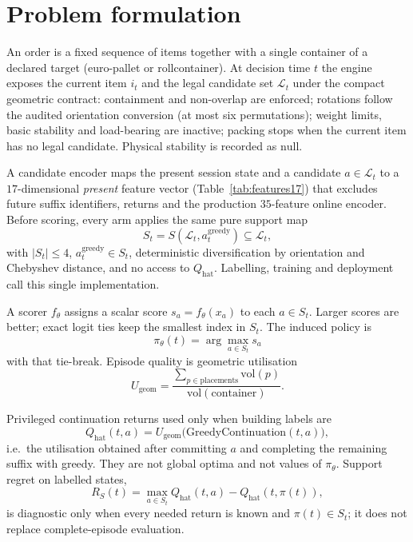 \section{Problem formulation}

An order is a fixed sequence of items together with a single container of a
declared target (euro-pallet or rollcontainer). At decision time $t$ the engine
exposes the current item $i_t$ and the legal candidate set $\mathcal{L}_t$ under
the compact geometric contract: containment and non-overlap are enforced;
rotations follow the audited orientation conversion (at most six permutations);
weight limits, basic stability and load-bearing are inactive; packing stops when
the current item has no legal candidate. Physical stability is recorded as
$\mathrm{null}$.

A candidate encoder maps the present session state and a candidate $a\in\mathcal{L}_t$
to a $17$-dimensional \emph{present} feature vector (Table~\ref{tab:features17}) that
excludes future suffix identifiers, returns and the production $35$-feature online
encoder. Before scoring, every arm applies the same pure support map
\begin{equation}
  S_t = S(\mathcal{L}_t,a^{\mathrm{greedy}}_t)\subseteq\mathcal{L}_t,
\end{equation}
with $|S_t|\le 4$, $a^{\mathrm{greedy}}_t\in S_t$, deterministic diversification
by orientation and Chebyshev distance, and no access to $Q_{\mathrm{hat}}$.
Labelling, training and deployment call this single implementation.

A scorer $f_\theta$ assigns a scalar score $s_a=f_\theta(x_a)$ to each
$a\in S_t$. Larger scores are better; exact logit ties keep the smallest index in
$S_t$. The induced policy is
\begin{equation}
  \pi_\theta(t)=\arg\max_{a\in S_t} s_a
\end{equation}
with that tie-break. Episode quality is geometric utilisation
\begin{equation}
  U_{\mathrm{geom}}
  =
  \frac{\sum_{p\in\mathrm{placements}}\mathrm{vol}(p)}{\mathrm{vol}(\mathrm{container})}.
\end{equation}

Privileged continuation returns used only when building labels are
\begin{equation}
  Q_{\mathrm{hat}}(t,a)
  =
  U_{\mathrm{geom}}\bigl(\mathrm{GreedyContinuation}(t,a)\bigr),
\end{equation}
i.e.\ the utilisation obtained after committing $a$ and completing the remaining
suffix with greedy. They are not global optima and not values of $\pi_\theta$.
Support regret on labelled states,
\begin{equation}
  R_S(t)=\max_{a\in S_t} Q_{\mathrm{hat}}(t,a)-Q_{\mathrm{hat}}(t,\pi(t)),
\end{equation}
is diagnostic only when every needed return is known and $\pi(t)\in S_t$; it does
not replace complete-episode evaluation.
